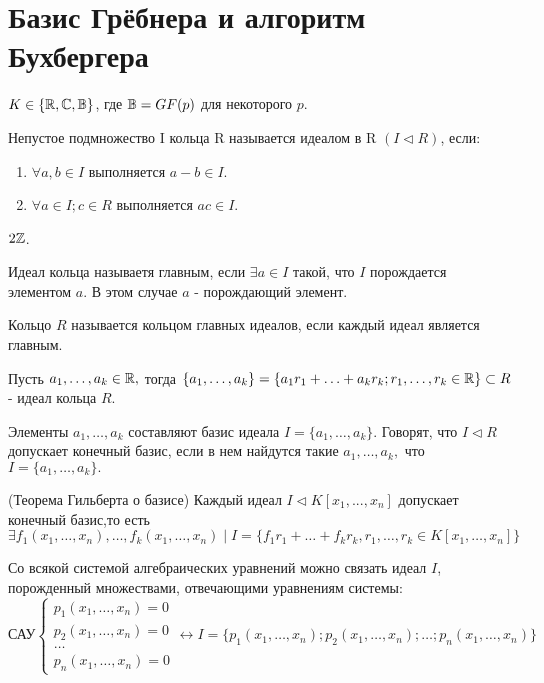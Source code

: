 \section {Базис Грёбнера и алгоритм Бухбергера}

$ K \in \{ \mathbb{R}, \mathbb{C}, \mathbb{B} \} $, где $\mathbb{B} = GF(p)$ для некоторого $p$.

\opr Непустое подмножество I кольца R называется идеалом в R $(I \triangleleft R)$, если:
\begin{enumerate}
	\item $\forall a,b \in I$ выполняется $a - b \in I$. 
	\item $\forall a \in I; c \in R$ выполняется $ac \in I$.
\end{enumerate}

\example $2\mathbb{Z}$.

\opr Идеал кольца называетя главным, если $\exists a \in I$ такой, что $I$ порождается элементом $a$. В этом случае $a$ - порождающий элемент.

\opr Кольцо $R$ называется кольцом главных идеалов, если каждый идеал является главным.

\utv Пусть $a_1,\ldots,a_k \in \mathbb{R},$ тогда $\{a_1,\ldots,a_k\} = \{ a_1r_1+\ldots+a_kr_k; r_1,\ldots,r_k \in \mathbb{R}\} \subset R$ - идеал кольца $R$.

\opr Элементы $a_1,\ldots,a_k$ составляют базис идеала $I = \{a_1,\ldots,a_k\}.$ Говорят, что $I \triangleleft R$ допускает конечный базис, если в нем найдутся такие $a_1,\ldots,a_k,$ что $I = \{a_1,\ldots,a_k\}.$

\thr (Теорема Гильберта о базисе) Каждый идеал $I \triangleleft K[x_1,...,x_n]$ допускает конечный базис,то есть $\exists  f_1(x_1,\ldots,x_n),\ldots,f_k(x_1,\ldots,x_n) \mid I = \{ f_1r_1 + \ldots + f_kr_k, r_1,\ldots,r_k \in K[x_1,\ldots,x_n] \}$ 
\par
Со всякой системой алгебраических уравнений можно связать идеал $I$, порожденный множествами, отвечающими уравнениям системы:
\begin{equation*}
	\text{САУ}
	\begin{cases}
	   	p_1(x_1,\ldots,x_n) = 0\\
	   	p_2(x_1,\ldots,x_n) = 0\\
		\ldots\\
		p_n(x_1,\ldots,x_n) = 0
	\end{cases}
	\leftrightarrow I = \{p_1(x_1,\ldots,x_n);p_2(x_1,\ldots,x_n);\ldots;p_n(x_1,\ldots,x_n)\}
\end{equation*}

